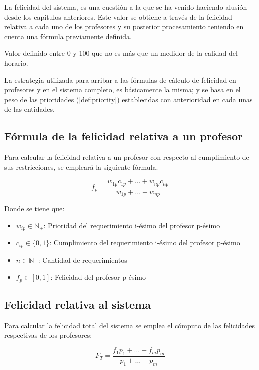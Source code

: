 La felicidad del sistema, es una cuestión a la que se ha venido haciendo alusión desde los capítulos anteriores. Este valor se obtiene a través de la felicidad relativa a cada uno de los profesores y su posterior procesamiento teniendo en cuenta una fórmula previamente definida.

\begin{dfn} 
	Valor definido entre 0 y 100 que no es más que un medidor de la calidad del horario.
\end{dfn}

La estrategia utilizada para arribar a las fórmulas de cálculo de felicidad en profesores y en el sistema completo, es básicamente la misma; y se basa en el peso de las prioridades (\ref{def:priority}) establecidas con anterioridad en cada unas de las entidades.

\subsection{Fórmula de la felicidad relativa a un profesor}
Para calcular la felicidad relativa a un profesor con respecto al cumplimiento de sus restricciones, se empleará la siguiente fórmula.

\begin{equation}
	f_p = \frac{w_{1p}c_{1p} + \dots + w_{np}c_{np} }{w_{1p} + \dots + w_{np}}
\end{equation}

\noindent Donde se tiene que: \\

\begin{itemize}
 	\item $w_{ip} \in \mathbb{N}_+ $: Prioridad del requerimiento i-ésimo del profesor p-ésimo
	\item $c_{ip} \in \{0, 1\}$: Cumplimiento del requerimiento i-ésimo del profesor p-ésimo
	\item $n \in \mathbb{N}_+$: Cantidad de requerimientos
	\item $f_p \in [0, 1]$: Felicidad del profesor p-ésimo
\end{itemize}

\subsection{Felicidad relativa al sistema}
Para calcular la felicidad total del sistema se emplea el cómputo de las felicidades respectivas de los profesores:

\begin{equation}
	F_T = \frac{f_1p_1 + \dots + f_mp_m}{p_1 + \dots + p_m}
\end{equation}

